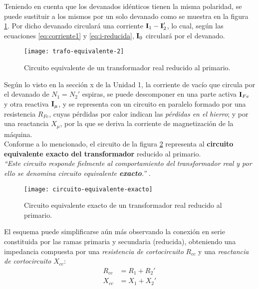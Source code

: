 Teniendo en cuenta que los devanados idénticos tienen la misma polaridad, se puede sustituir a los mismos por un solo devanado como se muestra en la figura \ref{fig:trafo-un-devanado}. Por dicho devanado circulará una corriente $\fasor{i}_1 - \fasor{i}_2'$, lo cual, según las ecuaciones \ref{eq:corriente1} y \ref{eq:i-reducida}, $\fasor{i}_0$ circulará por el devanado.


\begin{figure}[H]
	\centering
	\texttt{[image: trafo-equivalente-2]}
	\caption{Circuito equivalente de un transformador real reducido al primario.}
	\label{fig:trafo-un-devanado}
\end{figure}

Según lo visto en la sección x de la Unidad 1, la corriente de vacío que circula por el devanado de $N_1=N_2'$ espiras, se puede descomponer en una parte activa $\fasor{i}_{Fe}$ y otra reactiva $\fasor{i}_\mu$, y se representa con un circuito en paralelo formado por una resistencia $R_{Fe}$, cuyas pérdidas por calor indican las \textsl{pérdidas en el hierro}; y por una reactancia $X_{\mu}$, por la que se deriva la corriente de magnetización de la máquina.\\


Conforme a lo mencionado, el circuito de la figura \ref{fig:circuito-equivalente-exacto} representa al \textbf{circuito equivalente exacto del transformador} reducido al primario.\\


\textsl{``Este circuito responde fielmente al comportamiento del transformador real y por ello se denomina circuito equivalente \textbf{exacto}.''} 
\cite{maquinaselectricas} .

\begin{figure}[H]
	\centering
	\texttt{[image: circuito-equivalente-exacto]}
	\caption{Circuito equivalente exacto de un transformador real reducido al primario.}
	\label{fig:circuito-equivalente-exacto}
\end{figure}


El esquema puede simplificarse aún más observando la conexión en serie constituida por las ramas primaria y secundaria (reducida), obteniendo una impedancia compuesta por una \textsl{resistencia de cortocircuito} $R_{cc}$ y una \textsl{reactancia de cortocircuito} $X_{cc}$:
\begin{equation}
	\begin{aligned}
		R_{cc} &= R_1 + R_2'\\
		X_{cc} &= X_1 + X_2'
	\end{aligned}
\end{equation}

